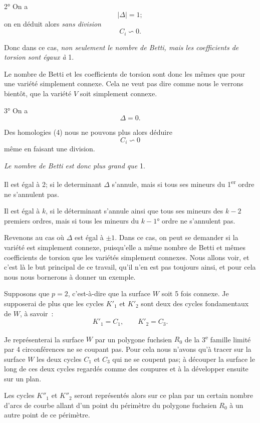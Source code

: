 \documentclass{article}
\begin{document}
2° On a
\[ |\Delta| = 1; \]
on en déduit alors \emph{sans division}
\[ C_{i} \backsim 0. \]


Donc dans ce cas, \emph{non seulement le nombre de Betti, mais les coefficients de torsion sont égaux à} 1.

Le nombre de Betti et les coefficients de torsion sont donc les mêmes que pour une variété simplement connexe. Cela ne veut pas dire comme nous le verrons bientôt, que la variété $V$ soit simplement connexe.

3° On a
\[ \Delta = 0. \]

Des homologies (4) nous ne pouvons plus alors déduire
\[ C_{i} \backsim 0 \]
même en faisant une division.

\emph{Le nombre de Betti est donc plus grand que} 1.

Il est égal à 2; si le determinant $\Delta$ s'annule, mais si tous ses mineurs du 1\textsuperscript{er} ordre ne s'annulent pas.

Il est égal à $k$, si le déterminant s'annule ainsi que tous ses mineurs des $k - 2$ premiers ordres, mais si tous les mineurs du $k - 1$° ordre ne s'annulent pas.

Revenons au cas où $\Delta$ est égal à $\pm 1$. Dans ce cas, on peut se demander si la variété est simplement connexe, puisqu'elle a même nombre de Betti et mêmes coefficients de torsion que les variétés simplement connexes. Nous allons voir, et c'est là le but principal de ce travail, qu'il n'en est pas toujours ainsi, et pour cela nous nous bornerons à donner un exemple.

Supposons que $p = 2$, c'est-à-dire que la surface $W$ soit 5 fois connexe. Je supposerai de plus que les cycles $K'_{1}$ et $K'_{2}$ sont deux des cycles fondamentaux de $W$, à savoir~:
\[ K'_{1} = C_{1}, \qquad K'_{2} = C_{3}. \]

Je représenterai la surface $W$ par un polygone fuchsien $R_{0}$ de la 3\textsuperscript{e} famille limité par 4 circonférences ne se coupant pas. Pour cela nous n'avons qu'à tracer sur la surface $W$ les deux cycles $C_{1}$ et $C_{3}$ qui ne se coupent pas; à découper la surface le long de ces deux cycles regardés comme des coupures et à la développer ensuite sur un plan.

Les cycles $K''_{1}$ et $K''_{2}$ seront représentés alors sur ce plan par un certain nombre d'arcs de courbe allant d'un point du périmètre du polygone fuchsien $R_{0}$ à un autre point de ce périmètre.
\end{document}
